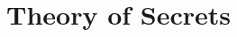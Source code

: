 \documentclass[aspectratio=169]{beamer}
\let\mathcal\relax
\begin{document}




\section{Theory of Secrets}
\end{document}
